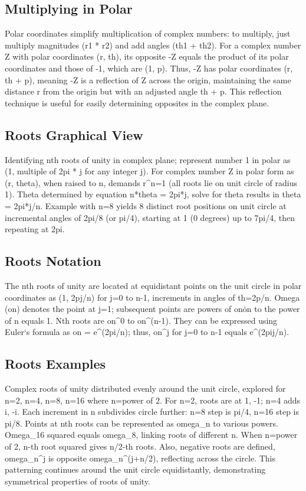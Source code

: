 \subsection*{Multiplying in Polar}
Polar coordinates simplify multiplication of complex numbers: to multiply, just multiply magnitudes (r1 * r2) and add angles (th1 + th2).
For a complex number Z with polar coordinates (r, th), its opposite -Z equals the product of its polar coordinates and those of -1, which are (1, p).
Thus, -Z has polar coordinates (r, th + p), meaning -Z is a reflection of Z across the origin, maintaining the same distance r from the origin but with an adjusted angle th + p.
This reflection technique is useful for easily determining opposites in the complex plane.

\subsection*{Roots  Graphical View}
Identifying nth roots of unity in complex plane; represent number 1 in polar as (1, multiple of 2pi * j for any integer j).
For complex number Z in polar form as (r, theta), when raised to n, demands r\textasciicircum{}n=1 (all roots lie on unit circle of radius 1).
Theta determined by equation n*theta = 2pi*j, solve for theta results in theta = 2pi*j/n.
Example with n=8 yields 8 distinct root positions on unit circle at incremental angles of 2pi/8 (or pi/4), starting at 1 (0 degrees) up to 7pi/4, then repeating at 2pi.

\subsection*{Roots  Notation}
The nth roots of unity are located at equidistant points on the unit circle in polar coordinates as (1, 2pj/n) for j=0 to n-1, increments in angles of th=2p/n.
Omega (on) denotes the point at j=1; subsequent points are powers of on\. on to the power of n equals 1.
Nth roots are on\textasciicircum{}0 to on\textasciicircum{}(n-1).
They can be expressed using Euler`s formula as on = e\textasciicircum{}(2pi/n); thus, on\textasciicircum{}j for j=0 to n-1 equals e\textasciicircum{}(2pij/n).

\subsection*{Roots  Examples}
Complex roots of unity distributed evenly around the unit circle, explored for n=2, n=4, n=8, n=16 where n=power of 2.
For n=2, roots are at 1, -1; n=4 adds i, -i.
Each increment in n subdivides circle further: n=8 step is pi/4, n=16 step is pi/8.
Points at nth roots can be represented as omega\_n to various powers.
Omega\_16 squared equals omega\_8, linking roots of different n.
When n=power of 2, n-th root squared gives n/2-th roots.
Also, negative roots are defined, omega\_n\textasciicircum{}j is opposite omega\_n\textasciicircum{}(j+n/2), reflecting across the circle.
This patterning continues around the unit circle equidistantly, demonstrating symmetrical properties of roots of unity.

